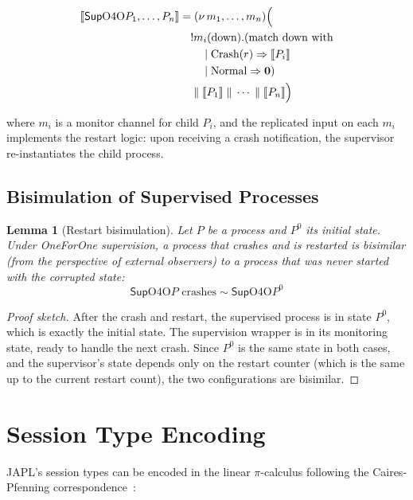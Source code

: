 \documentclass[11pt,a4paper]{article}
\newtheorem{lemma}[theorem]{Lemma}
\newcommand{\ppar}{\;\|\;}
\newcommand{\pzero}{\mathbf{0}}
\newcommand{\prepl}{!}
\newcommand{\pnew}[1]{(\nu\, #1)}
\newcommand{\precv}[2]{#1(#2)}
\newcommand{\bisim}{\sim}
\newcommand{\Sup}{\mathsf{Sup}}
\begin{document}
\begin{align}
\llbracket \Sup{\text{O4O}}{P_1, \ldots, P_n} \rrbracket &= \pnew{m_1, \ldots, m_n} \Big( \notag \\
& \quad \prepl \precv{m_i}{\text{down}}.(\text{match down with} \notag \\
& \qquad \mid \text{Crash}(r) \Rightarrow \llbracket P_i \rrbracket \notag \\
& \qquad \mid \text{Normal} \Rightarrow \pzero) \notag \\
& \quad \ppar \llbracket P_1 \rrbracket \ppar \cdots \ppar \llbracket P_n \rrbracket \Big) \notag
\end{align}

where $m_i$ is a monitor channel for child $P_i$, and the replicated input on each $m_i$ implements the restart logic: upon receiving a crash notification, the supervisor re-instantiates the child process.

\subsection{Bisimulation of Supervised Processes}

\begin{lemma}[Restart bisimulation]\label{lem:restart-bisim}
Let $P$ be a process and $P^0$ its initial state. Under OneForOne supervision, a process that crashes and is restarted is bisimilar (from the perspective of external observers) to a process that was never started with the corrupted state:
\[
\Sup{\text{O4O}}{P \text{ crashes}} \bisim \Sup{\text{O4O}}{P^0}
\]
\end{lemma}

\begin{proof}[Proof sketch]
After the crash and restart, the supervised process is in state $P^0$, which is exactly the initial state. The supervision wrapper is in its monitoring state, ready to handle the next crash. Since $P^0$ is the same state in both cases, and the supervisor's state depends only on the restart counter (which is the same up to the current restart count), the two configurations are bisimilar.
\end{proof}

\section{Session Type Encoding}\label{app:session-types}

JAPL's session types can be encoded in the linear $\pi$-calculus following the Caires-Pfenning correspondence~\citep{caires2010session}:
\end{document}
